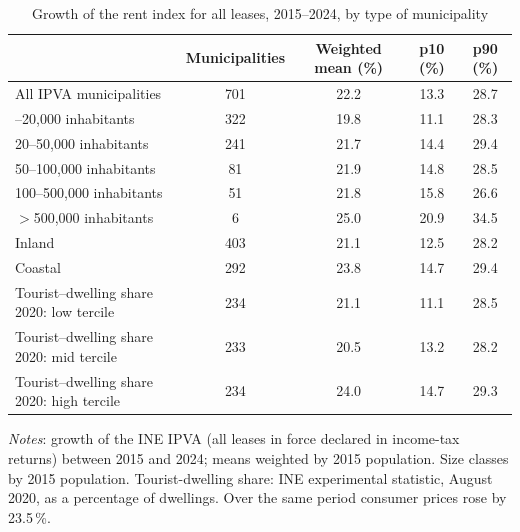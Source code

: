 \begin{table}[!htbp]\centering\small
\caption{Growth of the rent index for all leases, 2015--2024, by type of municipality}\label{tab:facts}
\begin{tabular}{lcccc}\toprule
 & Municipalities & Weighted mean (\%) & p10 (\%) & p90 (\%)\\\midrule
All IPVA municipalities & 701 & 22.2 & 13.3 & 28.7\\
\addlinespace
10--20,000 inhabitants & 322 & 19.8 & 11.1 & 28.3\\
20--50,000 inhabitants & 241 & 21.7 & 14.4 & 29.4\\
50--100,000 inhabitants & 81 & 21.9 & 14.8 & 28.5\\
100--500,000 inhabitants & 51 & 21.8 & 15.8 & 26.6\\
$>$500,000 inhabitants & 6 & 25.0 & 20.9 & 34.5\\
\addlinespace
Inland & 403 & 21.1 & 12.5 & 28.2\\
Coastal & 292 & 23.8 & 14.7 & 29.4\\
\addlinespace
Tourist--dwelling share 2020: low tercile & 234 & 21.1 & 11.1 & 28.5\\
Tourist--dwelling share 2020: mid tercile & 233 & 20.5 & 13.2 & 28.2\\
Tourist--dwelling share 2020: high tercile & 234 & 24.0 & 14.7 & 29.3\\
\bottomrule\end{tabular}
\begin{minipage}{0.92\linewidth}\footnotesize\vspace{4pt}
\textit{Notes}: growth of the INE IPVA (all leases in force declared in income-tax returns) between 2015 and 2024; means weighted by 2015 population. Size classes by 2015 population. Tourist-dwelling share: INE experimental statistic, August 2020, as a percentage of dwellings. Over the same period consumer prices rose by 23.5\,\%.
\end{minipage}\end{table}